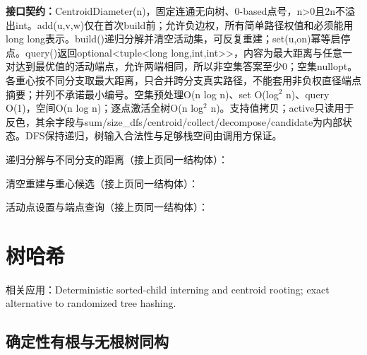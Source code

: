 {\sloppy{}\noindent\textbf{接口契约：}CentroidDiameter(n)，固定连通无向树、0-based点号，n>0且2n不溢出int。add(u,v,w)仅在首次build前；允许负边权，所有简单路径权值和必须能用long long表示。build()递归分解并清空活动集，可反复重建；set(u,on)幂等启停点。query()返回optional<tuple<long long,int,int>>，内容为最大距离与任意一对达到最优值的活动端点，允许两端相同，所以非空集答案至少0；空集nullopt。各重心按不同分支取最大距离，只合并跨分支真实路径，不能套用非负权直径端点摘要；并列不承诺最小编号。空集预处理O(n log n)、set O(log$^{2}$ n)、query O(1)，空间O(n log n)；逐点激活全树O(n log$^{2}$ n)。支持值拷贝；active只读用于反色，其余字段与sum/size\_dfs/centroid/collect/decompose/candidate为内部状态。DFS保持递归，树输入合法性与足够栈空间由调用方保证。\par}

\Needspace{545pt}



\newpage

\noindent 递归分解与不同分支的距离（接上页同一结构体）：



\newpage

\noindent 清空重建与重心候选（接上页同一结构体）：



\newpage

\noindent 活动点设置与端点查询（接上页同一结构体）：



\Needspace{180pt}

\section{树哈希}

\noindent 相关应用：Deterministic sorted-child interning and centroid rooting; exact alternative to randomized tree hashing.

\subsection{确定性有根与无根树同构}\label{compact-TreeIsomorphism}

